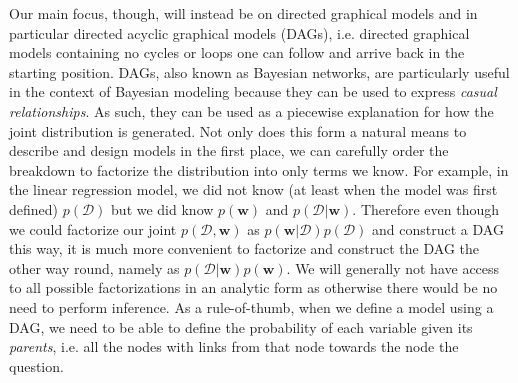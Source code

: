 Our main focus, though, will instead be on directed graphical models and in particular directed acyclic 
graphical models (DAGs), i.e. directed graphical models containing no cycles or loops one can follow 
and arrive back in the starting position.  DAGs, also known as Bayesian networks, are particularly
useful in the context of Bayesian modeling because they can be used to express \emph{casual relationships}.
As such, they can be used as a piecewise explanation for how the joint distribution is generated.
Not only does this form a natural means to describe and design models in the first place, 
we can carefully order the breakdown to factorize the distribution into only terms we know.  For example,
in the linear regression model, we did not know (at least when the model was first defined) 
$p(\mathcal{D})$ but we did know $p(\mathbf{w})$ and $p(\mathcal{D} | \mathbf{w})$.  Therefore even
though we could factorize our joint $p(\mathcal{D}, \mathbf{w})$ as 
$p(\mathbf{w} | \mathcal{D})p(\mathcal{D})$ and construct a DAG this way, it is much more convenient
to factorize and construct the DAG the other way round, namely as 
$p(\mathcal{D} | \mathbf{w})p(\mathbf{w})$.
We will generally not have access to all possible factorizations
in an analytic form as otherwise there would be no need to perform inference.
As a rule-of-thumb, when we define a model using a DAG, we need to be able to define the 
probability of each variable given its \emph{parents}, i.e. all the nodes with links from that node
towards the node the question.

